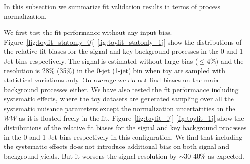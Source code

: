 In this subsection we summarize fit validation results in terms of process normalization.

We first test the fit performance without any input bias. 
Figure~\ref{fig:toyfit_statonly_0j}-\ref{fig:toyfit_statonly_1j} show the distributions of the relative fit biases 
for the signal and key background processes in the 0 and 1 Jet bins respectively. 
The signal is estimated without large bias ($\leq 4$\%) and the resolution is 28\% (35\%) in the 0-jet (1-jet) bin 
when toy are sampled with statistical variations only. 
On average we do not find biases on the main background processes either. 
We have also tested the fit performance including systematic effects, where the 
toy datasets are generated sampling over all the systematic nuisance parameters except the normalization 
uncertainties on the $WW$ as it is floated freely in the fit. 
Figure~\ref{fig:toyfit_0j}-\ref{fig:toyfit_1j} show the distributions of the relative fit biases 
for the signal and key background processes in the 0 and 1 Jet bins respectively in this configuration.  
We find that including the systematic effects does not introduce additional bias on both 
signal and background yields. But it worsens the signal resolution by $\sim$30-40\% as expected.  


